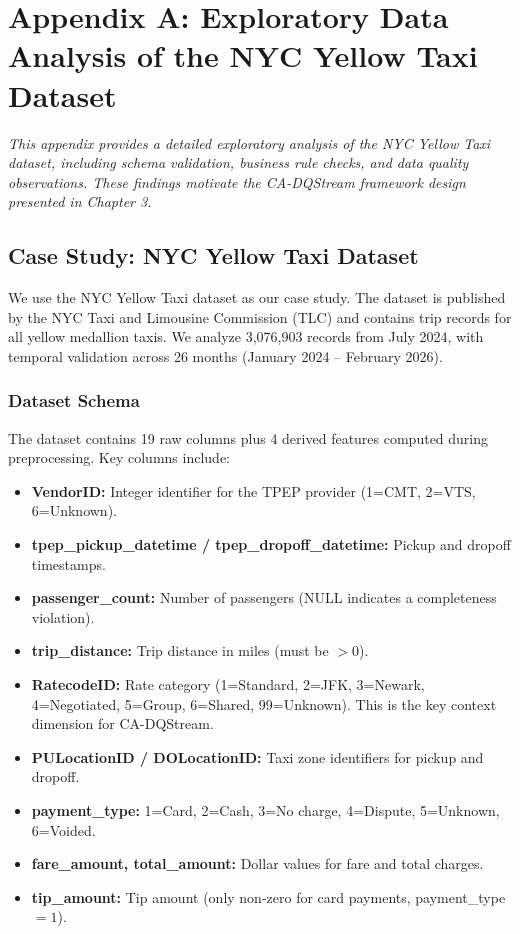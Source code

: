 \chapter*{Appendix A: Exploratory Data Analysis of the NYC Yellow Taxi Dataset}

\textit{This appendix provides a detailed exploratory analysis of the NYC Yellow Taxi dataset, including schema validation, business rule checks, and data quality observations. These findings motivate the CA-DQStream framework design presented in Chapter 3.}

\section{Case Study: NYC Yellow Taxi Dataset}

We use the NYC Yellow Taxi dataset as our case study. The dataset is published by the NYC Taxi and Limousine Commission (TLC) and contains trip records for all yellow medallion taxis. We analyze 3,076,903 records from July 2024, with temporal validation across 26 months (January 2024 -- February 2026).

\subsection{Dataset Schema}

The dataset contains 19 raw columns plus 4 derived features computed during preprocessing. Key columns include:

\begin{itemize}
    \item \textbf{VendorID:} Integer identifier for the TPEP provider (1=CMT, 2=VTS, 6=Unknown).
    \item \textbf{tpep\_pickup\_datetime / tpep\_dropoff\_datetime:} Pickup and dropoff timestamps.
    \item \textbf{passenger\_count:} Number of passengers (NULL indicates a completeness violation).
    \item \textbf{trip\_distance:} Trip distance in miles (must be $> 0$).
    \item \textbf{RatecodeID:} Rate category (1=Standard, 2=JFK, 3=Newark, 4=Negotiated, 5=Group, 6=Shared, 99=Unknown). This is the key context dimension for CA-DQStream.
    \item \textbf{PULocationID / DOLocationID:} Taxi zone identifiers for pickup and dropoff.
    \item \textbf{payment\_type:} 1=Card, 2=Cash, 3=No charge, 4=Dispute, 5=Unknown, 6=Voided.
    \item \textbf{fare\_amount, total\_amount:} Dollar values for fare and total charges.
    \item \textbf{tip\_amount:} Tip amount (only non-zero for card payments, payment\_type$=1$).
\end{itemize}

